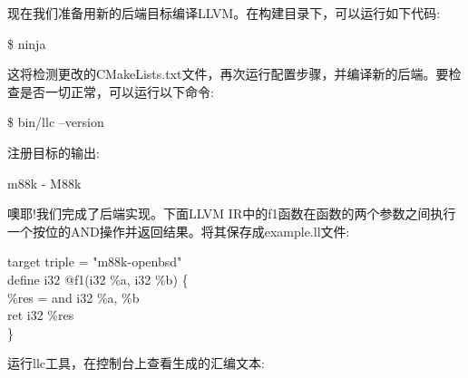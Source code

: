 现在我们准备用新的后端目标编译LLVM。在构建目录下，可以运行如下代码:\par

\begin{tcolorbox}[colback=white,colframe=black]
\$ ninja
\end{tcolorbox}

这将检测更改的CMakeLists.txt文件，再次运行配置步骤，并编译新的后端。要检查是否一切正常，可以运行以下命令:\par

\begin{tcolorbox}[colback=white,colframe=black]
\$ bin/llc –version
\end{tcolorbox}

注册目标的输出:\par

\begin{tcolorbox}[colback=white,colframe=black]
m88k   \hspace{2cm} - M88k
\end{tcolorbox}

噢耶!我们完成了后端实现。下面LLVM IR中的f1函数在函数的两个参数之间执行一个按位的AND操作并返回结果。将其保存成example.ll文件:\par

\begin{tcolorbox}[colback=white,colframe=black]
target triple = "m88k-openbsd" \\
define i32 @f1(i32 \%a, i32 \%b) \{ \\
\hspace*{0.5cm}\%res = and i32 \%a, \%b \\
\hspace*{0.5cm}ret i32 \%res \\
\}
\end{tcolorbox}

运行llc工具，在控制台上查看生成的汇编文本:\par

